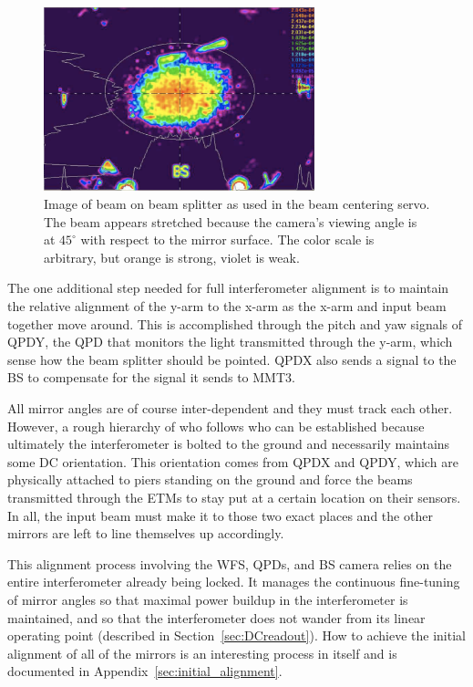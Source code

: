 \begin{figure} 
\begin{centering} \includegraphics[width=0.7\textwidth]{figures/BCSspiricon.pdf} 
\caption[Beam centering servo image of beam splitter]{Image of beam on beam splitter as used in the beam centering servo. The beam appears stretched because the camera's viewing angle is at $45^{\circ}$ with respect to the mirror surface. The color scale is arbitrary, but orange is strong, violet is weak.}
\label{fig:BCS}
\end{centering}
\end{figure}

The one additional step needed for full interferometer alignment is to maintain the relative alignment of the y-arm to the x-arm as the x-arm and input beam together move around. This is accomplished through the pitch and yaw signals of QPDY, the QPD that monitors the light transmitted through the y-arm, which sense how the beam splitter should be pointed. QPDX also sends a signal to the BS to compensate for the signal it sends to MMT3.

All mirror angles are of course inter-dependent and they must track each other. However, a rough hierarchy of who follows who can be established because ultimately the interferometer is bolted to the ground and necessarily maintains some DC orientation. This orientation comes from QPDX and QPDY, which are physically attached to piers standing on the ground and force the beams transmitted through the ETMs to stay put at a certain location on their sensors. In all, the input beam must make it to those two exact places and the other mirrors are left to line themselves up accordingly. 

This alignment process involving the WFS, QPDs, and BS camera relies on the entire interferometer already being locked. It manages the continuous fine-tuning of mirror angles so that maximal power buildup in the interferometer is maintained, and so that the interferometer does not wander from its linear operating point (described in Section~\ref{sec:DCreadout}). How to achieve the initial alignment of all of the mirrors is an interesting process in itself and is documented in Appendix~\ref{sec:initial_alignment}.



